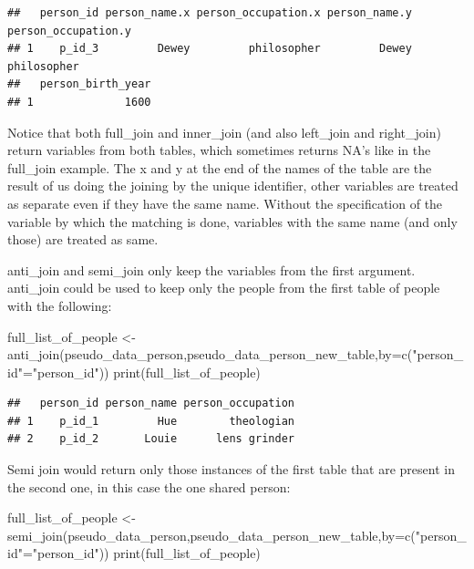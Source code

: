 \documentclass[
]{book}
\newenvironment{Shaded}{\begin{snugshade}}{\end{snugshade}}
\newcommand{\AttributeTok}[1]{\textcolor[rgb]{0.77,0.63,0.00}{#1}}
\newcommand{\FunctionTok}[1]{\textcolor[rgb]{0.00,0.00,0.00}{#1}}
\newcommand{\NormalTok}[1]{#1}
\newcommand{\OtherTok}[1]{\textcolor[rgb]{0.56,0.35,0.01}{#1}}
\newcommand{\StringTok}[1]{\textcolor[rgb]{0.31,0.60,0.02}{#1}}
\begin{document}
\begin{verbatim}
##   person_id person_name.x person_occupation.x person_name.y person_occupation.y
## 1    p_id_3         Dewey         philosopher         Dewey         philosopher
##   person_birth_year
## 1              1600
\end{verbatim}

Notice that both full\_join and inner\_join (and also left\_join and right\_join) return variables from both tables, which sometimes returns NA's like in the full\_join example. The x and y at the end of the names of the table are the result of us doing the joining
by the unique identifier, other variables are treated as separate even if they have the same name. Without the specification
of the variable by which the matching is done, variables with the same name (and only those) are treated as same.

anti\_join and semi\_join only keep the variables from the first argument. anti\_join could be used to keep only the people from
the first table of people with the following:

\begin{Shaded}
\begin{Highlighting}[]
\NormalTok{full\_list\_of\_people }\OtherTok{\textless{}{-}} \FunctionTok{anti\_join}\NormalTok{(pseudo\_data\_person,pseudo\_data\_person\_new\_table,}\AttributeTok{by=}\FunctionTok{c}\NormalTok{(}\StringTok{"person\_id"}\OtherTok{=}\StringTok{"person\_id"}\NormalTok{))}
\FunctionTok{print}\NormalTok{(full\_list\_of\_people)}
\end{Highlighting}
\end{Shaded}

\begin{verbatim}
##   person_id person_name person_occupation
## 1    p_id_1         Hue        theologian
## 2    p_id_2       Louie      lens grinder
\end{verbatim}

Semi join would return only those instances of the first table that are present in the second one, in this case the one shared person:

\begin{Shaded}
\begin{Highlighting}[]
\NormalTok{full\_list\_of\_people }\OtherTok{\textless{}{-}} \FunctionTok{semi\_join}\NormalTok{(pseudo\_data\_person,pseudo\_data\_person\_new\_table,}\AttributeTok{by=}\FunctionTok{c}\NormalTok{(}\StringTok{"person\_id"}\OtherTok{=}\StringTok{"person\_id"}\NormalTok{))}
\FunctionTok{print}\NormalTok{(full\_list\_of\_people)}
\end{Highlighting}
\end{Shaded}
\end{document}
